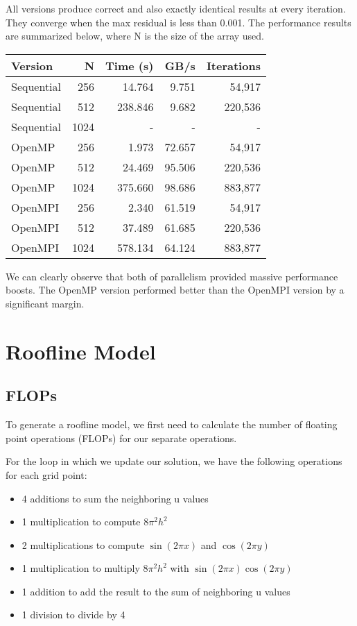 \documentclass[11pt]{article}
\begin{document}
All versions produce correct and also exactly identical results at every iteration. They converge when the max residual is less than 0.001. The performance results are summarized below, where N is the size of the array used.

\begin{table}[H]
    \centering
    \begin{tabular}{lrrrr}
        \toprule
        Version & N & Time (s) & GB/s & Iterations \\
        \midrule
        Sequential & 256 & 14.764 & 9.751 & 54,917 \\
        Sequential & 512 & 238.846 & 9.682 & 220,536 \\
        Sequential & 1024 & - & - & - \\
        OpenMP & 256 & 1.973 & 72.657 & 54,917 \\
        OpenMP & 512 & 24.469 & 95.506 & 220,536 \\
        OpenMP & 1024 & 375.660 & 98.686 & 883,877 \\
        OpenMPI & 256 & 2.340 & 61.519 & 54,917 \\
        OpenMPI & 512 & 37.489 & 61.685 & 220,536 \\
        OpenMPI & 1024 & 578.134 & 64.124 & 883,877 \\
        \bottomrule
    \end{tabular}
\end{table}

We can clearly observe that both of parallelism provided massive performance boosts. The OpenMP version performed better than the OpenMPI version by a significant margin. 

\section*{Roofline Model}

\subsection*{FLOPs}

To generate a roofline model, we first need to calculate the number of floating point operations (FLOPs) for our separate operations.

For the loop in which we update our solution, we have the following operations for each grid point:
\begin{itemize}
    \item 4 additions to sum the neighboring u values
    \item 1 multiplication to compute $8\pi^2 h^2$
    \item 2 multiplications to compute $\sin(2\pi x)$ and $\cos(2\pi y)$
    \item 1 multiplication to multiply $8\pi^2 h^2$ with $\sin(2\pi x) \cos(2\pi y)$
    \item 1 addition to add the result to the sum of neighboring u values
    \item 1 division to divide by 4
\end{itemize}
\end{document}
